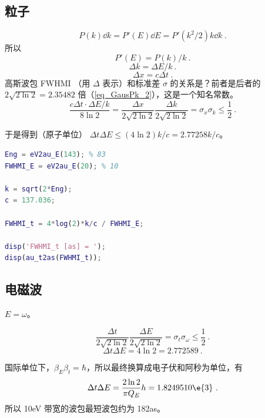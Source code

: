 
\subsection{粒子}
\begin{equation}
P(k)\dd{k} = P'(E)\dd{E} = P'(k^2/2)k\dd{k}~.
\end{equation}
所以
\begin{equation}
P'(E) = P(k)/k~.
\end{equation}
\begin{equation}
\Delta k = \Delta E/k~.
\end{equation}
\begin{equation}
\Delta x = c\Delta t~.
\end{equation}
高斯波包 FWHMI （用 $\Delta$ 表示）和标准差 $\sigma$ 的关系是？前者是后者的 $2\sqrt{2\ln 2} = 2.35482$ 倍（\autoref{eq_GausPk_2}），这是一个知名常数。
\begin{equation}
\frac{c\Delta t \cdot \Delta E/k}{8\ln 2} = \frac{\Delta x}{2\sqrt{2\ln 2}}\frac{\Delta k}{2\sqrt{2\ln 2}} = \sigma_x \sigma_k \leq \frac{1}{2}~.
\end{equation}

于是得到（原子单位） $\Delta t\Delta E \leq (4\ln 2)k/c = 2.77258 k/c$。

\begin{lstlisting}[language=matlab]
% 以上计算的 Matlab 代码
Eng = eV2au_E(143); % 83
FWHMI_E = eV2au_E(20); % 10

k = sqrt(2*Eng);
c = 137.036;

FWHMI_t = 4*log(2)*k/c / FWHMI_E;

disp('FWHMI_t [as] = ');
disp(au_t2as(FWHMI_t));
\end{lstlisting}

\subsection{电磁波}
$E = \omega$。

\begin{equation}
\frac{\Delta t}{2\sqrt{2\ln 2}}\frac{\Delta E}{2\sqrt{2\ln 2}} = \sigma_t \sigma_\omega \leq \frac{1}{2}~.
\end{equation}
\begin{equation}
\Delta t\Delta E = 4\ln 2 = 2.772589~.
\end{equation}

国际单位下，$\beta_E\beta_t = \hbar$，所以最终换算成电子伏和阿秒为单位，有
\begin{equation}
\Delta t \Delta E  = \frac{2\ln 2}{\pi Q_E}h = 1.8249510\e{3}~.
\end{equation}
所以 10eV 带宽的波包最短波包约为 182as。
